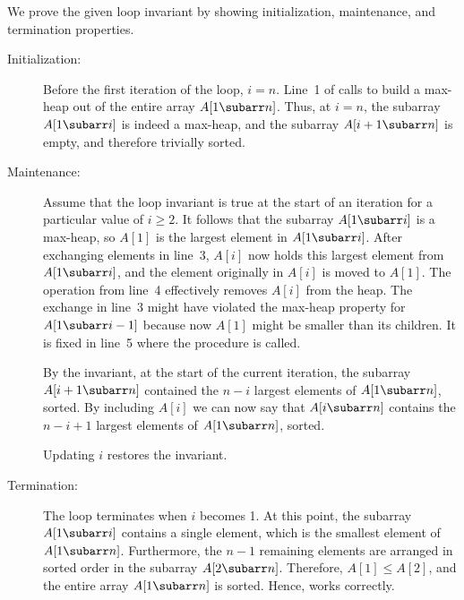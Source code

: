 We prove the given loop invariant by showing initialization, maintenance, and termination properties.
\begin{description}
    \item[Initialization:] Before the first iteration of the loop, $i=n$.
    Line~1 of  calls  to build a max-heap out of the entire array $A[1\subarr n]$.
    Thus, at $i=n$, the subarray $A[1\subarr i]$ is indeed a max-heap, and the subarray $A[i+1\subarr n]$ is empty, and therefore trivially sorted.
    \item[Maintenance:] Assume that the loop invariant is true at the start of an iteration for a particular value of $i\ge2$.
    It follows that the subarray $A[1\subarr i]$ is a max-heap, so $A[1]$ is the largest element in $A[1\subarr i]$.
    After exchanging elements in line~3, $A[i]$ now holds this largest element from $A[1\subarr i]$, and the element originally in $A[i]$ is moved to $A[1]$.
    The operation from line~4 effectively removes $A[i]$ from the heap.
    The exchange in line~3 might have violated the max-heap property for $A[1\subarr i-1]$ because now $A[1]$ might be smaller than its children.
    It is fixed in line~5 where the procedure  is called.

    By the invariant, at the start of the current iteration, the subarray $A[i+1\subarr n]$ contained the $n-i$ largest elements of $A[1\subarr n]$, sorted.
    By including $A[i]$ we can now say that $A[i\subarr n]$ contains the $n-i+1$ largest elements of $A[1\subarr n]$, sorted.

    Updating $i$ restores the invariant.
    \item[Termination:] The loop terminates when $i$ becomes 1.
    At this point, the subarray $A[1\subarr i]$ contains a single element, which is the smallest element of $A[1\subarr n]$.
    Furthermore, the $n-1$ remaining elements are arranged in sorted order in the subarray $A[2\subarr n]$.
    Therefore, $A[1]\le A[2]$, and the entire array $A[1\subarr n]$ is sorted.
    Hence,  works correctly.
\end{description}
